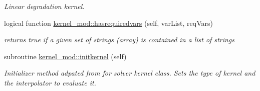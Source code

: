 \begin{DoxyCompactItemize}
\begin{DoxyCompactList}\small\item\em Linear degradation kernel. \end{DoxyCompactList}\item 
logical function \mbox{\hyperlink{namespacekernel__mod_a4444d73e7295ba4b58add9b726de3135}{kernel\+\_\+mod\+::hasrequiredvars}} (self, var\+List, req\+Vars)
\begin{DoxyCompactList}\small\item\em returns true if a given set of strings (array) is contained in a list of strings \end{DoxyCompactList}\item 
subroutine \mbox{\hyperlink{namespacekernel__mod_a26c62a8eec723402e20142e68ba7ec65}{kernel\+\_\+mod\+::initkernel}} (self)
\begin{DoxyCompactList}\small\item\em Initializer method adpated from for solver kernel class. Sets the type of kernel and the interpolator to evaluate it. \end{DoxyCompactList}\end{DoxyCompactItemize}
